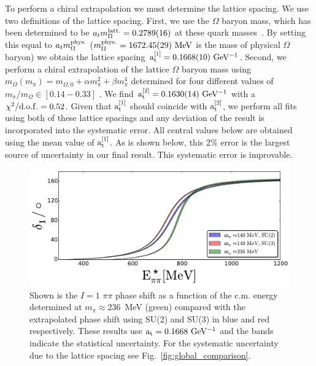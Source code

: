 \documentclass[twocolumn,hyperpdf,
amsmath,amssymb,
aps,prd,10pt,
superscriptaddress,nofootinbib,noeprint,preprintnumbers]{revtex4-1}
\begin{document}
To perform a chiral extrapolation we must determine the lattice spacing. We use two definitions of the lattice spacing. First, we use the $\Omega$ baryon mass, which has been determined to be $a_tm_\Omega^{\rm latt.}=0.2789(16)$ at these quark masses~\cite{Wilson:2015dqa}. By setting this equal to $a_tm_\Omega^{\rm phys.}$ ($m_\Omega^{\rm phys.}=1672.45(29)~\rm MeV$ is the mass of physical $\Omega$ baryon) we obtain the lattice spacing $\rm a_t^{[1]}=0.1668(10)~GeV^{-1}$.  Second, we perform a chiral extrapolation of the lattice $\Omega$ baryon mass using $m_\Omega(m_\pi)=m_{\Omega,0}+\alpha m_\pi^2+\beta m_\pi^4$ determined for four different values of $m_\pi/m_\Omega\in[0.14-0.33]$ \cite{Lin:2008pr, Wilson:2015dqa}. We find $\rm a^{[2]}_t=0.1630(14)~GeV^{-1}$ with a $\rm \chi^2/d.o.f.=0.52$. Given that $\rm a_t^{[1]}$ should coincide with $\rm a_t^{[2]}$, we perform all fits using both of these lattice spacings and any deviation of the result is incorporated into the systematic error. All central values below are obtained using the mean value of $\rm a_t^{[1]}$. As is shown below, this $2\%$ error is the largest source of uncertainty in our final result. This systematic error is improvable.

\begin{figure}[b]
\begin{center}
\includegraphics[scale=0.35]{figures/SU2_SU3_comparison.pdf}
\caption{Shown is the $I=1$ $\pi\pi$ phase shift as a function of the c.m. energy determined at $m_\pi\approx 236$~MeV (green) compared with the extrapolated phase shift using SU(2) and SU(3) in blue and red respectively. These results use $\rm a_t=0.1668~GeV^{-1}$ and the bands indicate the statistical uncertainty. For the systematic uncertainty due to the lattice spacing see Fig.~\ref{fig:global_comparison}. }
\label{fig:extrapolations}
\vspace*{-.6cm}
\end{center}
\end{figure}
 
\end{document}
